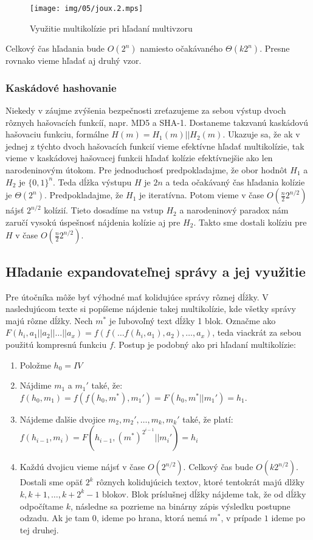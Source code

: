 \begin{figure}[h!]
    \centering
    \texttt{[image: img/05/joux.2.mps]}
    \caption{Využitie multikolízie pri hľadaní multivzoru}
    \label{fig:joux2}
\end{figure}

Celkový čas hľadania bude $O(2^n)$ namiesto očakávaného $\Theta(k 2^n)$.
Presne rovnako vieme hľadať aj druhý vzor.

\subsubsection{Kaskádové hashovanie}
Niekedy v záujme zvýšenia bezpečnosti zreťazujeme za sebou výstup
dvoch rôznych hašovacích funkcíí, napr.
MD5 a SHA-1. Dostaneme takzvanú kaskádovú hašovaciu funkciu,
formálne $H(m) = H_1(m)||H_2(m)$. 
Ukazuje sa, že ak v jednej z týchto dvoch hašovacích funkcií
vieme efektívne hľadať multikolízie, tak vieme
v kaskádovej hašovacej funkcii hľadať kolízie efektívnejšie
ako len narodeninovým útokom.
Pre jednoduchosť predpokladajme, že obor hodnôt $H_1$
a $H_2$ je $\{0,1\}^n$. Teda dĺžka výstupu $H$ je $2n$ a teda
očakávaný čas hľadania kolízie je $\Theta(2^n)$.
Predpokladajme, že $H_1$ je iteratívna. Potom vieme v čase 
$O(\frac{n}{2} 2^{n/2})$ nájsť $2^{n/2}$ kolízií. Tieto dosadíme
na vstup $H_2$ a narodeninový paradox nám zaručí
vysokú úspešnosť nájdenia kolízie aj pre $H_2$. Takto sme dostali
kolíziu pre $H$ v čase $O(\frac{n}{2} 2^{n/2})$.

\subsection{Hľadanie expandovateľnej správy a jej využitie}

Pre útočníka môže byť výhodné mať kolidujúce správy rôznej dĺžky. 
V nasledujúcom texte si popíšeme nájdenie takej multikolízie,
kde všetky správy majú rôzne dĺžky. Nech $m^*$ je ľubovoľný
text dĺžky 1 blok.
Označme ako $F(h_i, a_1||a_2||\dots||a_x) = f(f(\dots f(h_i, a_1), a_2), \dots, a_x)$,
teda viackrát za sebou použitú kompresnú funkciu $f$.
Postup je podobný ako pri hľadaní multikolízie:
\begin{enumerate}
\itemsep -1.2mm
\item Položme $h_0 = IV$
\item Nájdime $m_1$ a $m_1'$ také, že: $f(h_0, m_1) = f(f(h_0, m^*), m_1') = F(h_0, m^*||m_1') = h_1$. 
\item Nájdeme ďalšie dvojice $m_2, m_2', \dots, m_k, m_k'$ také, že platí:
$f(h_{i-1}, m_i) = F(h_{i-1}, (m^*)^{2^{i-1}}||m_i') = h_i$
\item Každú dvojicu vieme nájsť v čase $O(2^{n/2})$. Celkový čas bude $O(k 2^{n/2})$.
Dostali sme opäť $2^k$ rôznych kolidujúcich textov, ktoré tentokrát 
majú dlžky $k, k+1, \dots, k+2^k-1$ blokov. 
Blok príslušnej dĺžky nájdeme tak, že od dĺžky odpočítame $k$, následne
sa pozrieme na binárny zápis výsledku postupne odzadu. Ak je tam $0$, ideme
po hrana, ktorá nemá $m^*$, v prípade $1$ ideme po tej druhej.
\end{enumerate}

